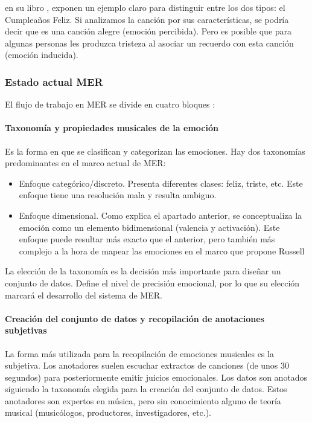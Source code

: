 \documentclass[12pt,a4paper]{article}
\begin{document}
\citeauthor{yang2011music} en su libro  \cite{yang2011music}, exponen un ejemplo claro para distinguir entre los dos tipos: el Cumpleaños Feliz. Si analizamos la canción por sus características, se podría decir que es una canción alegre (emoción percibida). Pero es posible que para algunas personas les produzca tristeza al asociar un recuerdo con esta canción (emoción inducida).

\subsubsection{Estado actual MER}
El flujo de trabajo en MER se divide en cuatro bloques \cite{GomezCanon2021SPM}:


\paragraph{Taxonomía y propiedades musicales de la emoción}\label{tax_emo}
Es la forma en que se clasifican y categorizan las emociones. Hay dos taxonomías predominantes en el marco actual de MER:
\begin{itemize}
	\item Enfoque categórico/discreto. Presenta diferentes clases: feliz, triste, etc. Este enfoque tiene una resolución mala y resulta ambiguo.
	\item Enfoque dimensional. Como explica el apartado anterior, se conceptualiza la emoción como un elemento bidimensional (valencia y activación). Este enfoque puede resultar más exacto que el anterior, pero también más complejo a la hora de mapear las emociones en el marco que propone Russell \cite{posner2005circumplex}
\end{itemize}

La elección de la taxonomía es la decisión más importante para diseñar un conjunto de datos. Define el nivel de precisión emocional, por lo que su elección marcará el desarrollo del sistema de MER.

\paragraph{Creación del conjunto de datos y recopilación de anotaciones subjetivas}
La forma más utilizada para la recopilación de emociones musicales es la subjetiva. Los anotadores suelen escuchar extractos de canciones (de unos 30 segundos) para posteriormente emitir juicios emocionales. Los datos son anotados siguiendo la taxonomía elegida para la creación del conjunto de datos. Estos anotadores son expertos en música, pero sin conocimiento alguno de teoría musical (musicólogos, productores, investigadores, etc.).
\end{document}
